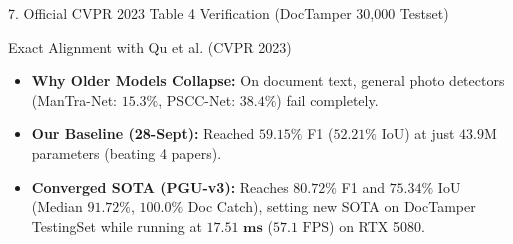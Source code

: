 \documentclass[aspectratio=169, 10pt]{beamer}
\begin{document}
\begin{frame}{7. Official CVPR 2023 Table 4 Verification (DocTamper 30,000 Testset)}
  \begin{crispbox}{Exact Alignment with Qu et al. (CVPR 2023)}
    \begin{itemize}\scriptsize
      \item \textbf{Why Older Models Collapse:} On document text, general photo detectors (ManTra-Net: $15.3\%$, PSCC-Net: $38.4\%$) fail completely.
      \item \textbf{Our Baseline (28-Sept):} Reached $\mathbf{59.15\%}$ F1 ($\mathbf{52.21\%}$ IoU) at just $43.9$M parameters (beating 4 papers).
      \item \textbf{Converged SOTA (PGU-v3):} Reaches $\mathbf{80.72\%}$ F1 and $\mathbf{75.34\%}$ IoU (Median $\mathbf{91.72\%}$, $\mathbf{100.0\%}$ Doc Catch), setting new SOTA on DocTamper TestingSet while running at $\mathbf{17.51\text{ ms}}$ ($57.1\text{ FPS}$) on RTX 5080.
    \end{itemize}
  \end{crispbox}
\end{frame}
\end{document}
